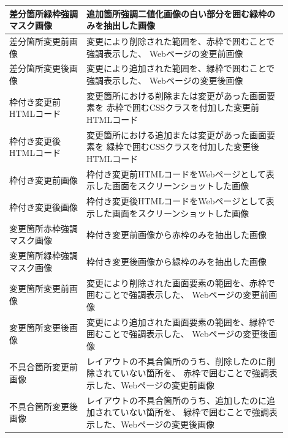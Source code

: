 \begin{table}[tp]
\begin{tabular}{p{0.25\linewidth}|p{0.65\linewidth}}
        差分箇所緑枠強調マスク画像  & 追加箇所強調二値化画像の白い部分を囲む緑枠のみを抽出した画像                                                                          \\ \hline    
        差分箇所変更前画像          & 変更により削除された範囲を、赤枠で囲むことで強調表示した、           Webページの変更前画像                                            \\ \hline
        差分箇所変更後画像          & 変更により追加された範囲を、緑枠で囲むことで強調表示した、           Webページの変更後画像                                            \\ \hline
        枠付き変更前HTMLコード      & 変更箇所における削除または変更があった画面要素を                     赤枠で囲むCSSクラスを付加した変更前HTMLコード                    \\ \hline
        枠付き変更後HTMLコード      & 変更箇所における追加または変更があった画面要素を                     緑枠で囲むCSSクラスを付加した変更後HTMLコード                    \\ \hline
        枠付き変更前画像            & 
        
        枠付き変更前HTMLコードをWebページとして表示した画面をスクリーンショットした画像                                                                       
        \\  \hline                                         
        枠付き変更後画像            & 
        
        枠付き変更後HTMLコードをWebページとして表示した画面をスクリーンショットした画像                                                                       
        \\  \hline                                               
        変更箇所赤枠強調マスク画像  & 枠付き変更前画像から赤枠のみを抽出した画像                                                                                            \\ \hline
        変更箇所緑枠強調マスク画像  & 枠付き変更後画像から緑枠のみを抽出した画像                                                                                            \\ \hline
        変更箇所変更前画像          & 変更により削除された画面要素の範囲を、赤枠で囲むことで強調表示した、 Webページの変更前画像                                            \\ \hline
        変更箇所変更後画像          & 変更により追加された画面要素の範囲を、緑枠で囲むことで強調表示した、 Webページの変更後画像                                            \\ \hline
        不具合箇所変更前画像        & レイアウトの不具合箇所のうち、削除したのに削除されていない箇所を、   赤枠で囲むことで強調表示した、Webページの変更前画像              \\ \hline
        不具合箇所変更後画像        & レイアウトの不具合箇所のうち、追加したのに追加されていない箇所を、   緑枠で囲むことで強調表示した、Webページの変更後画像              \\ \hline
    \end{tabular}
\end{table}

